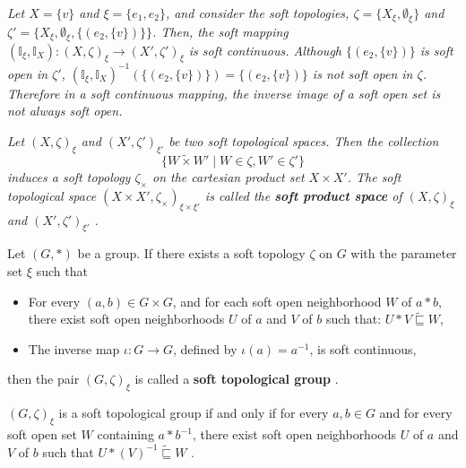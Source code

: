 \documentclass[preprint,12pt]{elsarticle}
\begin{document}
 \begin{ex}\em{
Let $X = \{v\}$ and $\xi = \{e_1,e_2\}$, and consider the soft topologies, $\zeta=\{X_\xi,\emptyset_\xi\}$ and $\zeta'=\{X_\xi,\emptyset_\xi,\{(e_2,\{v\})\}\}$.
Then, the soft mapping $(\mathbb{I}_\xi,\mathbb{I}_X) : (X, \zeta)_\xi \to (X', \zeta')_\xi$ is soft continuous. Although $\{(e_2,\{v\})\}$ is soft open in $\zeta'$,  $(\mathbb{I}_\xi,\mathbb{I}_X)^{-1}(\{(e_2,\{v\})\})=\{(e_2,\{v\})\}$ is not soft open in $\zeta$. Therefore
in a soft continuous mapping, the inverse image of a soft open set is not always soft open.}
 \end{ex}


\begin{defn}\em{
Let \( (X, \zeta)_\xi \) and \( (X', \zeta')_{\xi'} \) be two soft topological spaces.
Then the collection
\[
\{ W \widetilde{\times} W' \mid W \in \zeta, W' \in \zeta' \}
\]
induces a soft topology \( \zeta_\times \) on the cartesian product set \( X\times X' \).
The soft topological space \( (X \times X',\zeta_\times)_ {\xi \times \xi'} \)
is called the \textbf{soft product space} of \( (X, \zeta)_\xi \) and \( (X', \zeta')_{\xi'} \)
\cite{Hida}.}
\end{defn}

\begin{defn}\em{
Let \( (G,\ast) \) be a group. If there exists a soft topology $\zeta$ on $G$ with the parameter set $\xi$ such that

\begin{itemize}
    \item
 For every \( (a, b) \in G\times G \), and  for each soft open neighborhood \( W \) of \( a \ast b \),
    there exist soft open neighborhoods \( U \) of \( a\) and \( V \) of \( b \) such that:
    \(
    U \ast V \widetilde{\sqsubseteq} W,
    \)

    \item The inverse map \( \iota : G \to G \), defined by \( \iota(a) = a^{-1} \), is soft continuous,
\end{itemize}
then the pair \( ( G ,\zeta )_\xi\) is called a \textbf{soft topological group}
\cite{Hida}.}
\end{defn}


\begin{prop}\label{topgroup}
 \( ( G ,\zeta )_\xi\) is a soft topological group if and only if for every \( a, b \in G \) and for every soft open set \( W \) containing \( a\ast b^{-1} \), there exist soft open neighborhoods \( U \) of \( a\) and \( V \) of \( b \) such that
 \( U \ast (V)^{-1} \widetilde{\sqsubseteq} W
\) \cite{Hida}.
\end{prop}
\end{document}
